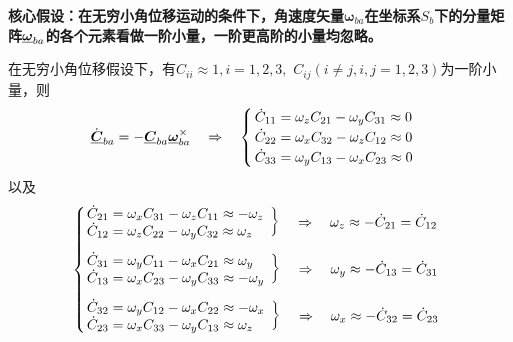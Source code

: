 \textbf{核心假设：在无穷小角位移运动的条件下，角速度矢量$\bm{\omega}_{ba}$在坐标系$S_b$下的分量矩阵$\underline{\bm{\omega}}_{ba}$的各个元素看做一阶小量，一阶更高阶的小量均忽略。}
\vspace*{1em}

\sssection[方向余弦矩阵]

在无穷小角位移假设下，有$C_{ii}  \approx 1, i = 1,2,3,\,\, C_{ij}(i \neq j, i,j = 1,2,3)$为一阶小量，则
\begin{equation}
	\dot{\underline{\bm{C}}}_{ba} = - \underline{\bm{C}}_{ba} \underline{\bm{\omega}}_{ba}^\times \quad \Rightarrow \quad 
	\begin{cases}
		\, \dot{C}_{11} = \omega_z C_{21} - \omega_y C_{31} \approx 0 \\
		\, \dot{C}_{22} = \omega_x C_{32} - \omega_z C_{12} \approx 0 \\
		\, \dot{C}_{33} = \omega_y C_{13} - \omega_x C_{23} \approx 0
	\end{cases}
\end{equation}
以及
\begin{equation}
		\left \lbrace 
		\begin{array}{l}
			\left.
			\begin{array}{l}
				\hspace*{-1em} \dot{C}_{21} = \omega_x C_{31} - \omega_z C_{11} \approx - \omega_z \\
				\hspace*{-1em} \dot{C}_{12} = \omega_z C_{22} - \omega_y C_{32} \approx \omega_z 
			\end{array}
			\right \rbrace \quad \Rightarrow \quad \omega_z \approx - \dot{C}_{21} = \dot{C}_{12} \\[1.5em]
			\left.
			\begin{array}{l}
				\hspace*{-1em} \dot{C}_{31} = \omega_y C_{11} - \omega_x C_{21} \approx \omega_y \\
				\hspace*{-1em} \dot{C}_{13} = \omega_x C_{23} - \omega_y C_{33} \approx - \omega_y
			\end{array}
			\right \rbrace \quad \Rightarrow \quad \omega_y \approx - \dot{C}_{13} = \dot{C}_{31} \\[1.5em]
				\left.
			\begin{array}{l}
				\hspace*{-1em} \dot{C}_{32} = \omega_y C_{12} - \omega_x C_{22} \approx - \omega_x \\
				\hspace*{-1em} \dot{C}_{23} = \omega_x C_{33} - \omega_y C_{13} \approx \omega_z 
			\end{array}
			\right \rbrace \quad \Rightarrow \quad \omega_x \approx - \dot{C}_{32} = \dot{C}_{23} \\
		\end{array}
		\right.
\end{equation}

